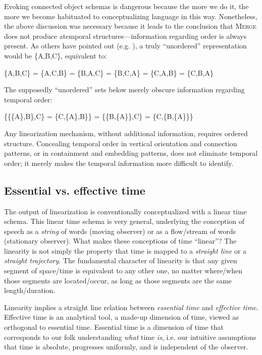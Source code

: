   Evoking connected object schemas is dangerous because the more we do it, the more we become habituated to conceptualizing language in this way. Nonetheless, the above discussion was necessary because it leads to the conclusion that \textsc{Merge} does not produce atemporal structures—information regarding order is always present. As others have pointed out (e.g. \citealt{Yang1999}), a truly “unordered” representation would be \{A,B,C\}, equivalent to:

  \{A,B,C\} = \{A,C,B\} = \{B,A,C\} = \{B,C,A\} = \{C,A,B\} = \{C,B,A\}

The supposedly “unordered” sets below merely obscure information regarding temporal order:

  \{\{\{A\},B\},C\} = \{C,\{A\},B\}\} = \{\{B,\{A\}\},C\} = \{C,\{B,\{A\}\}\}

Any linearization mechanism, without additional information, requires ordered structure. Concealing temporal order in vertical orientation and connection patterns, or in containment and embedding patterns, does not eliminate temporal order; it merely makes the temporal information more difficult to identify. 

\subsection{Essential vs. effective time}

The output of linearization is conventionally conceptualized with a linear time schema. This linear time schema is very general, underlying the conception of speech as a \textit{string} of words (moving observer) or as a flow/stream of words (stationary observer). What makes these conceptions of time “linear”?  The linearity is not simply the property that time is mapped to a \textit{straight line} or a \textit{straight trajectory}. The fundamental character of linearity is that any given segment of space/time is equivalent to any other one, no matter where/when those segments are located/occur, as long as those segments are the same length/duration. 

  Linearity implies a straight line relation between \textit{essential time} and \textit{effective time}. Effective time is an analytical tool, a made-up dimension of time, viewed as orthogonal to essential time. Essential time is a dimension of time that corresponds to our folk understanding \textit{what} time \textit{is}, i.e. our intuitive assumptions that time is absolute, progresses uniformly, and is independent of the observer.

